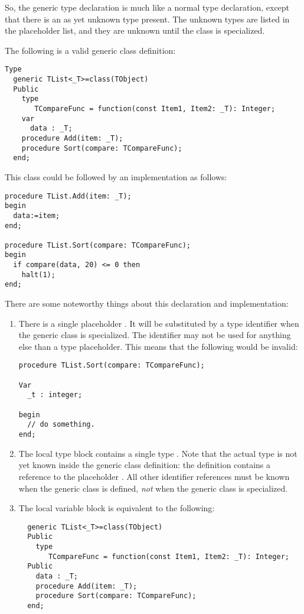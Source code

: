 So, the generic type declaration is much like a normal type declaration, except that there is an as yet unknown type present.
The unknown types are listed in the placeholder list, and they are unknown until the class is specialized.

The following is a valid generic class definition:
\begin{verbatim}
Type
  generic TList<_T>=class(TObject)
  Public 
    type 
       TCompareFunc = function(const Item1, Item2: _T): Integer;
    var 
      data : _T;
    procedure Add(item: _T);
    procedure Sort(compare: TCompareFunc);
  end;
\end{verbatim}
This class could be followed by an implementation as follows:
\begin{verbatim}
procedure TList.Add(item: _T);
begin
  data:=item;
end;

procedure TList.Sort(compare: TCompareFunc);
begin
  if compare(data, 20) <= 0 then
    halt(1);
end;
\end{verbatim}
There are some noteworthy things about this declaration and implementation:
\begin{enumerate}
\item There is a single placeholder . It will be substituted by a
type identifier when the generic class is specialized. The identifier
 may not be used for anything else than a type placeholder. 
This means that the following would be invalid:
\begin{verbatim}
procedure TList.Sort(compare: TCompareFunc);

Var
  _t : integer;

begin
  // do something.
end;
\end{verbatim}
\item The local type block contains a single type . Note
that the actual type is not yet known inside the generic class definition:
the definition contains a reference to the placeholder . All other
identifier references must be known when the generic class is defined, {\em not}
when the generic class is specialized.
\item The local variable block is equivalent to the following:
\begin{verbatim}
  generic TList<_T>=class(TObject)
  Public
    type 
       TCompareFunc = function(const Item1, Item2: _T): Integer;
  Public  
    data : _T;
    procedure Add(item: _T);
    procedure Sort(compare: TCompareFunc);
  end;
\end{verbatim}
\end{enumerate}

